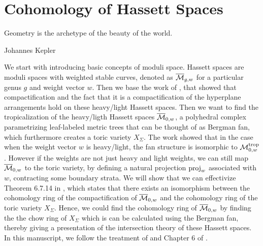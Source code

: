 \chapter{Cohomology of Hassett Spaces}
\label{chp:tropocalization-of-moduli-space-of-curves}
\epigraph{Geometry is the archetype of the beauty of the world.}{Johannes Kepler}
    We start with introducing basic concepts of moduli space.
    Hassett spaces are moduli spaces with weighted stable curves, 
    denoted as $\overline{\mathcal{M}}_{g, w}$ for a particular genus $g$ and weight vector $w$.
    Then we base the work of \citet{Cavalieri2014}, 
    that showed that compactification and the fact 
    that it is a compactification of the hyperplane arrangements hold on these heavy/light Hassett spaces. 
    Then we want to find the tropicalization of the heavy/ligth Hassett spaces $\overline{\mathcal{M}}_{0, w}$, 
    a polyhedral complex parametrizing leaf-labeled metric trees that can be thought of as Bergman fan, 
    which furthermore creates a toric variety $X_{\Sigma}$. 
    The work \citet{Cavalieri2014} showed that in the case when the weight vector $w$ is heavy/light, 
    the fan structure is isomorphic to $\mathcal{M}_{0, w}^{\operatorname{trop}}$.
    However if the weights are not just heavy and light weights,
    we can still map $\overline{\mathcal{M}}_{0, w}$ to the toric variety,
    by defining a natural projection $\operatorname{proj}_w$ associated with $w$,
    contracting some boundary strata.
    We will show that we can effectivize Theorem 6.7.14 in \cite{Maclagan2015}, 
    which states that there exists an isomorphism between the cohomology ring of the compactification of $\overline{\mathcal{M}}_{0, w}$ 
    and the cohomology ring of the toric variety $X_\Sigma$.
    Hence, we could find the cohomology ring of $\overline{\mathcal{M}}_{0, w}$
    by finding the the chow ring of $X_\Sigma$ which is can be calculated using the Bergman fan, 
    thereby giving a presentation of the intersection theory of these Hassett spaces.
    In this manuscript, 
    we follow the treatment of \citet{Cavalieri2014}
    and Chapter 6 of \citet{Maclagan2015}.




	


